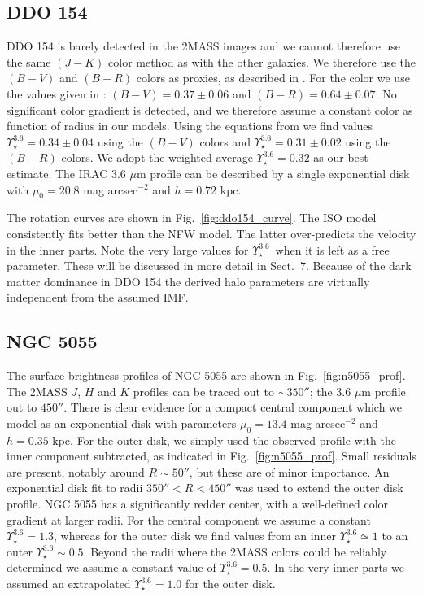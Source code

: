\documentclass[usenatbib,usegraphicx,apjfonts,floatfix]{emulateapj}
\newcommand{\Ups}{\ensuremath{\Upsilon_{\star}^{3.6}}}
\begin{document}
\subsection{DDO 154}

DDO 154 is barely detected in the 2MASS images and we cannot therefore
use the same $(J-K)$ color method as with the other galaxies.  We
therefore use the $(B-V)$ and $(B-R)$ colors as proxies, as described
in \citet{oh2007}. For the color we use the values given in
\citet{car_beaulieu}: $(B-V) = 0.37 \pm 0.06$ and $(B-R) = 0.64 \pm
0.07$.  No significant color gradient is detected, and we therefore
assume a constant color as function of radius in our models.  Using
the equations from \citet{oh2007} we find values $\Ups = 0.34 \pm
0.04$ using the $(B-V)$ colors and $\Ups=0.31 \pm 0.02$ using the
$(B-R)$ colors. We adopt the weighted average $\Ups = 0.32$ as our
best estimate.  The IRAC 3.6 $\mu$m profile can be described by a
single exponential disk with $\mu_0 = 20.8$ mag arcsec$^{-2}$ and
$h=0.72$ kpc.

The rotation curves are shown in Fig.~\ref{fig:ddo154_curve}. The ISO
model consistently fits better than the NFW model. The latter
over-predicts the velocity in the inner parts. Note the very large
values for \Ups\ when it is left as a free parameter. These will be
discussed in more detail in Sect.~7. Because of the dark matter
dominance in DDO 154 the derived halo parameters are virtually
independent from the assumed IMF.

\subsection{NGC 5055}

The surface brightness profiles of NGC 5055 are shown in
Fig.~\ref{fig:n5055_prof}. The 2MASS $J$, $H$ and $K$ profiles can be
traced out to $\sim 350''$; the 3.6 $\mu$m profile out to $450''$.
There is clear evidence for a compact central component which we model
as an exponential disk with parameters $\mu_0 = 13.4$ mag
arcsec$^{-2}$ and $h=0.35$ kpc.  For the outer disk, we simply used
the observed profile with the inner component subtracted, as indicated
in Fig.~\ref{fig:n5055_prof}. Small residuals are present, notably
around $R \sim 50''$, but these are of minor importance. An
exponential disk fit to radii $350'' < R < 450''$ was used to extend
the outer disk profile.  NGC 5055 has a significantly redder center,
with a well-defined color gradient at larger radii.  For the central
component we assume a constant $\Ups = 1.3$, whereas for the outer
disk we find values from an inner $\Ups \simeq 1$ to an outer $\Ups
\sim 0.5$.  Beyond the radii where the 2MASS colors could be reliably
determined we assume a constant value of $\Ups=0.5$. In the very inner
parts we assumed an extrapolated $\Ups = 1.0$ for the outer disk.
\end{document}
